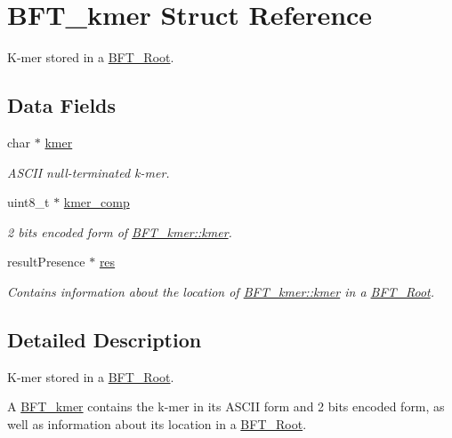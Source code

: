 \hypertarget{structBFT__kmer}{}\section{B\+F\+T\+\_\+kmer Struct Reference}
\label{structBFT__kmer}


K-\/mer stored in a \hyperlink{structBFT__Root}{B\+F\+T\+\_\+\+Root}.  


\subsection*{Data Fields}
\begin{DoxyCompactItemize}
\item 
char $\ast$ \hyperlink{structBFT__kmer_ae4cf6766f01ebfa54fe51d0e60bec942}{kmer}
\begin{DoxyCompactList}\small\item\em A\+S\+C\+II null-\/terminated k-\/mer. \end{DoxyCompactList}\item 
uint8\+\_\+t $\ast$ \hyperlink{structBFT__kmer_a9935a78617deffcf7a24fcca0143962c}{kmer\+\_\+comp}
\begin{DoxyCompactList}\small\item\em 2 bits encoded form of \hyperlink{structBFT__kmer_ae4cf6766f01ebfa54fe51d0e60bec942}{B\+F\+T\+\_\+kmer\+::kmer}. \end{DoxyCompactList}\item 
result\+Presence $\ast$ \hyperlink{structBFT__kmer_aab6ab4e17d069ebb9e5c467d8fee5002}{res}
\begin{DoxyCompactList}\small\item\em Contains information about the location of \hyperlink{structBFT__kmer_ae4cf6766f01ebfa54fe51d0e60bec942}{B\+F\+T\+\_\+kmer\+::kmer} in a \hyperlink{structBFT__Root}{B\+F\+T\+\_\+\+Root}. \end{DoxyCompactList}\end{DoxyCompactItemize}


\subsection{Detailed Description}
K-\/mer stored in a \hyperlink{structBFT__Root}{B\+F\+T\+\_\+\+Root}. 

A \hyperlink{structBFT__kmer}{B\+F\+T\+\_\+kmer} contains the k-\/mer in its A\+S\+C\+II form and 2 bits encoded form, as well as information about its location in a \hyperlink{structBFT__Root}{B\+F\+T\+\_\+\+Root}. 

